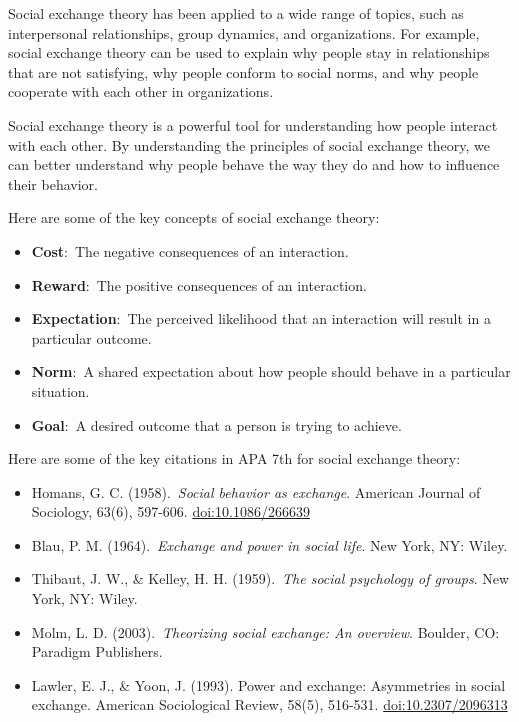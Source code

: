 \documentclass[
  b5paper]{book}
\begin{document}
Social exchange theory has been applied to a wide range of topics, such as interpersonal relationships, group dynamics, and organizations. For example, social exchange theory can be used to explain why people stay in relationships that are not satisfying, why people conform to social norms, and why people cooperate with each other in organizations.

Social exchange theory is a powerful tool for understanding how people interact with each other. By understanding the principles of social exchange theory, we can better understand why people behave the way they do and how to influence their behavior.

Here are some of the key concepts of social exchange theory:

\begin{itemize}
\item
  \textbf{Cost}:~The negative consequences of an interaction.
\item
  \textbf{Reward}:~The positive consequences of an interaction.
\item
  \textbf{Expectation}:~The perceived likelihood that an interaction will result in a particular outcome.
\item
  \textbf{Norm}:~A shared expectation about how people should behave in a particular situation.
\item
  \textbf{Goal}:~A desired outcome that a person is trying to achieve.
\end{itemize}

Here are some of the key citations in APA 7th for social exchange theory:

\begin{itemize}
\item
  Homans, G. C. (1958).~\emph{Social behavior as exchange}. American Journal of Sociology, 63(6), 597-606. \url{doi:10.1086/266639}
\item
  Blau, P. M. (1964).~\emph{Exchange and power in social life}. New York, NY: Wiley.
\item
  Thibaut, J. W., \& Kelley, H. H. (1959).~\emph{The social psychology of groups}. New York, NY: Wiley.
\item
  Molm, L. D. (2003).~\emph{Theorizing social exchange: An overview}. Boulder, CO: Paradigm Publishers.
\item
  Lawler, E. J., \& Yoon, J. (1993). Power and exchange: Asymmetries in social exchange. American Sociological Review, 58(5), 516-531. \url{doi:10.2307/2096313}
\end{itemize}
\end{document}
